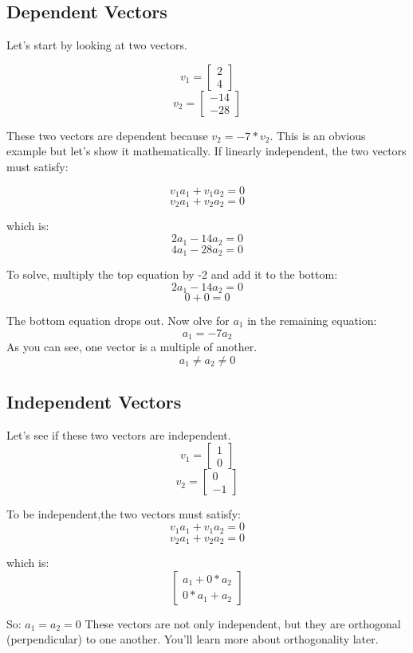 \subsection{Dependent Vectors}
Let's start by looking at two vectors. 

$$v_1 = \begin{bmatrix}
			2 \\
			4
		\end{bmatrix}$$
$$v_2 = \begin{bmatrix}
			-14 \\
			-28
\end{bmatrix}$$

These two vectors are dependent because $v_2 = -7*v_2$. This is an obvious example but let's show it mathematically. If linearly independent, the two vectors must satisfy:

	$$v_1a_1 + v_1a_2 = 0$$
	$$v_2a_1 + v_2a_2 = 0$$

which is:
	$$2a_1 -14a_2 = 0$$
	$$4a_1 -28a_2 = 0$$

To solve, multiply the top equation by -2 and add it to the bottom: 
$$2a_1 -14a_2 = 0 $$
$$ 0  + 0     = 0 $$

The bottom equation drops out. Now  olve for $a_1$ in the remaining equation:
$$a_1 = -7a_2$$
As you can see, one vector is a multiple of another. $$a_1 \neq a_2 \neq 0$$

\subsection{Independent Vectors}
Let's see if these two vectors are independent.
$$v_1 = \begin{bmatrix}
1 \\
0
\end{bmatrix}$$
$$v_2 = \begin{bmatrix}
0 \\
-1
\end{bmatrix}$$

To be independent,the two vectors must satisfy:
	$$v_1a_1 + v_1a_2 = 0$$
	$$v_2a_1 + v_2a_2 = 0$$
	
which is:
$$\begin{bmatrix}
	a_1 + 0*a_2 \\
	0*a_1 + a_2
\end{bmatrix}$$

So:
$a_1 = a_2 = 0$
These vectors are not only independent, but they are orthogonal (perpendicular) to one another. You'll learn more about orthogonality later.

